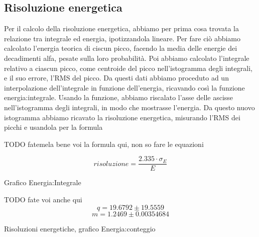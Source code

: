 \subsection{Risoluzione energetica}
\FloatBarrier
Per il calcolo della risoluzione energetica, abbiamo per prima cosa trovata la relazione tra integrale ed energia, ipotizzandola lineare. 
Per fare ciò abbiamo calcolato l'energia teorica di ciscun picco, facendo la media delle energie dei decadimenti alfa, pesate sulla loro probabilità. 
Poi abbiamo calcolato l'integrale relativo a ciascun picco, come centroide del picco nell'istogramma degli integrali, e il suo errore, l'RMS del picco.
Da questi dati abbiamo proceduto ad un interpolazione dell'integrale in funzione dell'energia, ricavando così la funzione energia:integrale. 
Usando la funzione, abbiamo riscalato l'asse delle ascisse nell'istogramma degli integrali, in modo che mostrasse l'energia. 
Da questo nuovo istogramma abbiamo ricavato la risoluzione energetica, misurando l'RMS dei picchi e usandola per la formula

TODO fatemela bene voi la formula qui, non so fare le equazioni

$$risoluzione=\frac{2.335\cdot\sigma_E}{E}$$

\begin{grafico}
 \centering
 \resizebox{\textwidth}{!}{%
 
 }%
 \caption{Grafico Energia:Integrale} 
 \label{gr:energy_integral.tex} 
\end{grafico}

TODO fate voi anche qui
$$q=19.6792\pm19.5559$$
$$m=1.2469\pm0.00354684$$

\begin{grafico}
 \centering
 \caption{Risoluzioni energetiche, grafico Energia:conteggio} 
 \label{gr:600_energy.tex} 
\end{grafico}

\FloatBarrier